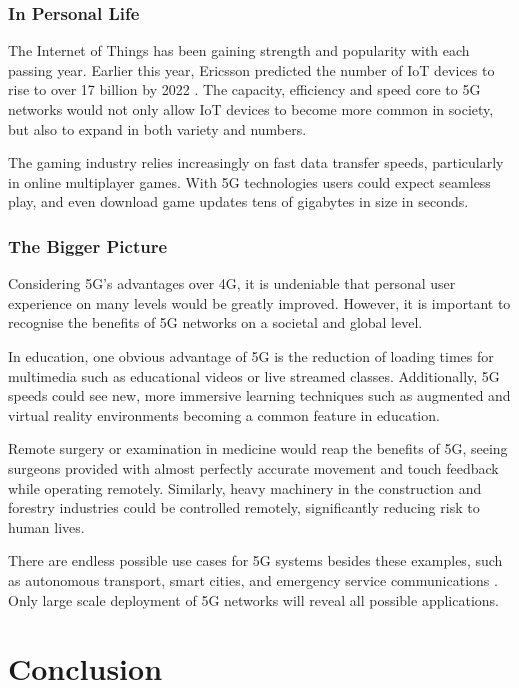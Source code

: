 \documentclass[journal]{IEEEtran}
\begin{document}
\subsubsection{In Personal Life}
The Internet of Things has been gaining strength and popularity with each passing year. Earlier this year, Ericsson predicted the number of IoT devices to rise to over 17 billion by 2022 \cite{ericssondev}. The capacity, efficiency and speed core to 5G networks would not only allow IoT devices to become more common in society, but also to expand in both variety and numbers.

The gaming industry relies increasingly on fast data transfer speeds, particularly in online multiplayer games. With 5G technologies users could expect seamless play, and even download game updates tens of gigabytes in size in seconds.

\subsubsection{The Bigger Picture}
Considering 5G's advantages over 4G, it is undeniable that personal user experience on many levels would be greatly improved. However, it is important to recognise the benefits of 5G networks on a societal and global level.

In education, one obvious advantage of 5G is the reduction of loading times for multimedia such as educational videos or live streamed classes. Additionally, 5G speeds could see new, more immersive learning techniques such as augmented and virtual reality environments becoming a common feature in education.

Remote surgery or examination in medicine would reap the benefits of 5G, seeing surgeons provided with almost perfectly accurate movement and touch feedback while operating remotely. \cite{wp5g} Similarly, heavy machinery in the construction and forestry industries could be controlled remotely, significantly reducing risk to human lives.

There are endless possible use cases for 5G systems besides these examples, such as autonomous transport, smart cities, and emergency service communications \cite{wp5g}. Only large scale deployment of 5G networks will reveal all possible applications.

\section{Conclusion}

\printbibliography
\end{document}
